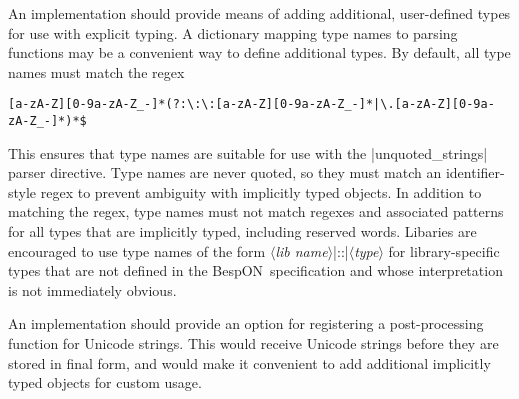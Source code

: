 \documentclass[11pt]{article}
\newcommand{\bespon}{BespON}
\newcommand{\vmeta}[1]{{\color{DarkRed}\ensuremath{\langle}\textit{#1}\ensuremath{\rangle}}}
\begin{document}
{{An implementation should provide means of adding additional, user-defined types for use with explicit typing.  A dictionary mapping type names to parsing functions may be a convenient way to define additional types.  By default, all type names must match the regex
\begin{Verbatim}
[a-zA-Z][0-9a-zA-Z_-]*(?:\:\:[a-zA-Z][0-9a-zA-Z_-]*|\.[a-zA-Z][0-9a-zA-Z_-]*)*$
\end{Verbatim}
This ensures that type names are suitable for use with the |unquoted_strings| parser directive.  Type names are never quoted, so they must match an identifier-style regex to prevent ambiguity with implicitly typed objects.  In addition to matching the regex, type names must not match regexes and associated patterns for all types that are implicitly typed, including reserved words.  Libaries are encouraged to use type names of the form \vmeta{lib name}|::|\vmeta{type} for library-specific types that are not defined in the \bespon\ specification and whose interpretation is not immediately obvious.  

An implementation should provide an option for registering a post-processing function for Unicode strings.  This would receive Unicode strings before they are stored in final form, and would make it convenient to add additional implicitly typed objects for custom usage.









}}
\end{document}
